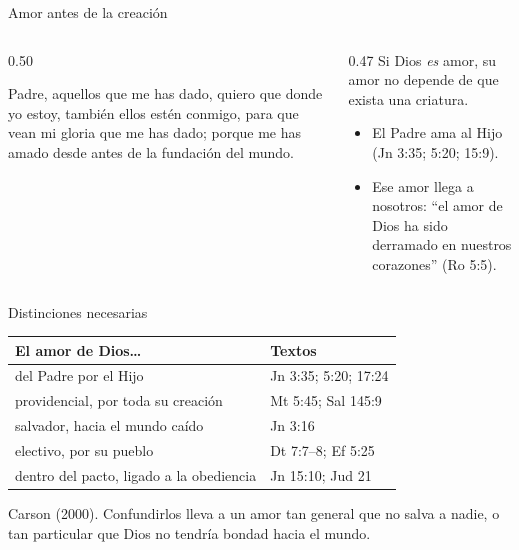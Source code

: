 \begin{frame}{Amor antes de la creación}
\begin{columns}[c,onlytextwidth]
\begin{column}{0.50\textwidth}
\begin{cita}Padre, aquellos que me has dado, quiero que donde yo estoy, también ellos estén conmigo, para que vean mi gloria que me has dado; porque me has amado desde antes de la fundación del mundo.\end{cita}
\end{column}
\begin{column}{0.47\textwidth}\small
Si Dios \emph{es} amor, su amor no depende de que exista una criatura.
\begin{itemize}
\item El Padre ama al Hijo (Jn 3:35; 5:20; 15:9).
\item Ese amor llega a nosotros: ``el amor de Dios ha sido derramado en nuestros corazones'' (Ro 5:5).
\end{itemize}
\end{column}
\end{columns}
\end{frame}

\begin{frame}{Distinciones necesarias}
\small\renewcommand{\arraystretch}{1.18}
\begin{tabular}{@{}>{\RaggedRight\arraybackslash}p{5.4cm}>{\RaggedRight\arraybackslash}p{6.4cm}@{}}
\toprule
\textbf{El amor de Dios\ldots} & \textbf{Textos} \\ \midrule
del Padre por el Hijo & Jn 3:35; 5:20; 17:24 \\
providencial, por toda su creación & Mt 5:45; Sal 145:9 \\
salvador, hacia el mundo caído & Jn 3:16 \\
electivo, por su pueblo & Dt 7:7--8; Ef 5:25 \\
dentro del pacto, ligado a la obediencia & Jn 15:10; Jud 21 \\
\bottomrule
\end{tabular}\par\smallskip
\scriptsize Carson (2000). Confundirlos lleva a un amor tan general que no salva a nadie, o tan particular que Dios no tendría bondad hacia el mundo.\par
{}
\end{frame}

